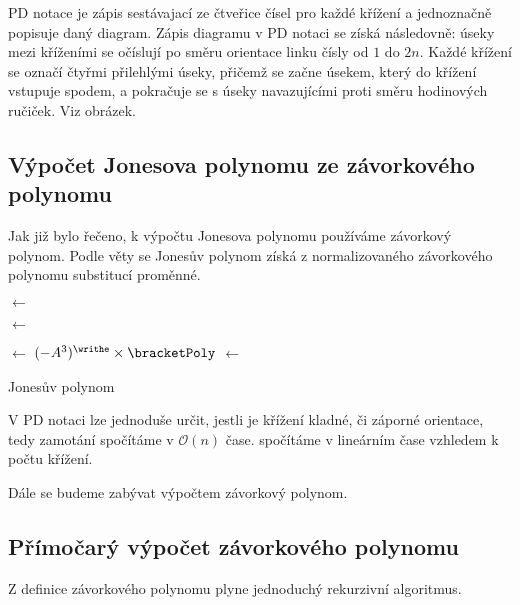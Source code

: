 PD notace je zápis sestávajací ze čtveřice čísel pro každé křížení a jednoznačně popisuje daný diagram. Zápis diagramu v PD notaci se získá následovně: úseky mezi kříženími se očíslují po směru orientace linku čísly od $1$ do $2 n$. Každé křížení se označí čtyřmi přilehlými úseky, přičemž se začne úsekem, který do křížení vstupuje spodem, a pokračuje se s úseky navazujícími proti směru hodinových ručiček. Viz obrázek.

\subsection{Výpočet Jonesova polynomu ze závorkového polynomu}

Jak již bylo řečeno, k výpočtu Jonesova polynomu používáme závorkový polynom. Podle věty se Jonesův polynom získá z normalizovaného závorkového polynomu substitucí proměnné. 

\begin{algorithm}[H]
\DontPrintSemicolon
{}

\BlankLine

\bracketPoly $\leftarrow$ 

\writhe $\leftarrow$ 

\normal $\leftarrow$ $ (-A^3)^{\writhe} \times \bracketPoly $
\jones $\leftarrow$ 

\KwRet \jones 

\caption{Jonesův polynom} 
\end{algorithm}

V PD notaci lze jednoduše určit, jestli je křížení kladné, či záporné orientace, tedy zamotání spočítáme v $\mathcal{O} (n)$ čase.
spočítáme v lineárním čase vzhledem k počtu křížení.

Dále se budeme zabývat výpočtem závorkový polynom.



\subsection{Přímočarý výpočet závorkového polynomu}
Z definice závorkového polynomu plyne jednoduchý rekurzivní algoritmus.

